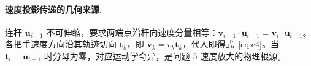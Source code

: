 \documentclass[a4paper, 12pt]{ctexart}
\begin{document}
\paragraph{速度投影传递的几何来源.} 连杆 $\boldsymbol{u}_{i-1}$ 不可伸缩，要求两端点沿杆向速度分量相等：$\boldsymbol{v}_{i-1}\cdot\boldsymbol{u}_{i-1}=\boldsymbol{v}_i\cdot\boldsymbol{u}_{i-1}$。各把手速度方向沿其轨迹切向 $\boldsymbol{t}_k$，即 $\boldsymbol{v}_k=v_k\boldsymbol{t}_k$，代入即得式~\eqref{eq:c4}。当 $\boldsymbol{t}_i\perp\boldsymbol{u}_{i-1}$ 时分母为零，对应运动学奇异，是问题 5 速度放大的物理根源。
\end{document}
